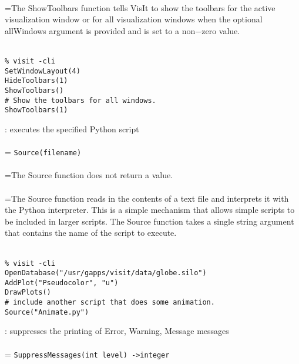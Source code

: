 \documentclass[10pt,a4paper]{report}
\begin{document}
 \\ 
\hangindent=\parindent The ShowToolbars function tells VisIt to show the toolbars for the active visualization window or for all visualization windows when the optional allWindows argument is provided and is set to a non$-$zero value. \\[-3mm] 

\\[-6mm]
\begin{verbatim}% visit -cli
SetWindowLayout(4)
HideToolbars(1)
ShowToolbars()
# Show the toolbars for all windows.
ShowToolbars(1)
\end{verbatim}
\newpage


{}
: executes the specified Python script\\[-3mm]

 \\ 
\hangindent=\parindent 
\verb!Source(filename)!\\ [-3mm]

 \\ 
\hangindent=\parindent The Source function does not return a value. \\[-3mm] 

 \\ 
\hangindent=\parindent The Source function reads in the contents of a text file and interprets it with the Python interpreter. This is a simple mechanism that allows simple scripts to be included in larger scripts. The Source function takes a single string argument that contains the name of the script to execute. \\[-3mm] 

\\[-6mm]
\begin{verbatim}% visit -cli
OpenDatabase("/usr/gapps/visit/data/globe.silo")
AddPlot("Pseudocolor", "u")
DrawPlots()
# include another script that does some animation.
Source("Animate.py")
\end{verbatim}
\newpage


{}
: suppresses the printing of Error, Warning, Message messages\\[-3mm]

 \\ 
\hangindent=\parindent 
\verb!SuppressMessages(int level) ->integer!\\ [-3mm]
\end{document}

